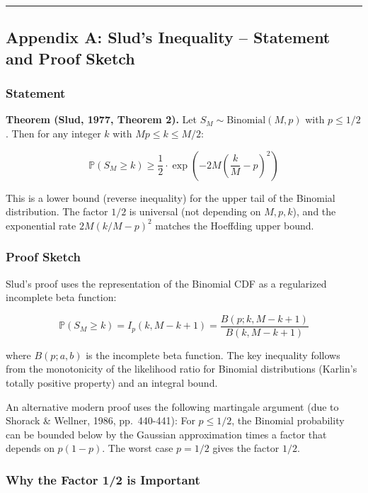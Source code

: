\documentclass[
  12pt,
]{article}
\begin{document}
\begin{center}\rule{0.5\linewidth}{0.5pt}\end{center}

\subsection{Appendix A: Slud's Inequality -- Statement and Proof
Sketch}\label{appendix-a-sluds-inequality-statement-and-proof-sketch}

\subsubsection{Statement}\label{statement}

\textbf{Theorem (Slud, 1977, Theorem 2).} Let
\(S_M \sim \text{Binomial}(M, p)\) with \(p \leq 1/2\). Then for any
integer \(k\) with \(Mp \leq k \leq M/2\):

\[\mathbb{P}(S_M \geq k) \geq \frac{1}{2} \cdot \exp\!\left(-2M\left(\frac{k}{M} - p\right)^2\right)\]

This is a lower bound (reverse inequality) for the upper tail of the
Binomial distribution. The factor \(1/2\) is universal (not depending on
\(M, p, k\)), and the exponential rate \(2M(k/M - p)^2\) matches the
Hoeffding upper bound.

\subsubsection{Proof Sketch}\label{proof-sketch}

Slud's proof uses the representation of the Binomial CDF as a
regularized incomplete beta function:

\[\mathbb{P}(S_M \geq k) = I_p(k, M-k+1) = \frac{B(p; k, M-k+1)}{B(k, M-k+1)}\]

where \(B(p; a, b)\) is the incomplete beta function. The key inequality
follows from the monotonicity of the likelihood ratio for Binomial
distributions (Karlin's totally positive property) and an integral
bound.

An alternative modern proof uses the following martingale argument (due
to Shorack \& Wellner, 1986, pp.~440-441): For \(p \leq 1/2\), the
Binomial probability can be bounded below by the Gaussian approximation
times a factor that depends on \(p(1-p)\). The worst case \(p = 1/2\)
gives the factor \(1/2\).

\subsubsection{Why the Factor 1/2 is
Important}\label{why-the-factor-12-is-important}
\end{document}
